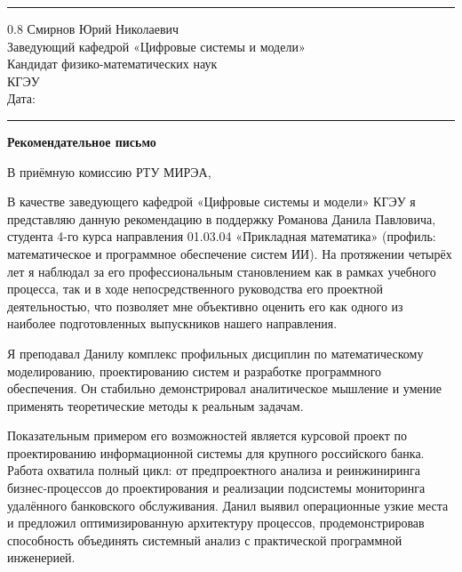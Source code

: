 \documentclass[a4paper,12pt]{article}
\begin{document}
\vspace{4pt}
\noindent\rule{\textwidth}{0.8pt}

\begin{flushright}
  \begin{spacing}{0.8}
    Смирнов Юрий Николаевич\\
    Заведующий кафедрой «Цифровые системы и модели»\\
    Кандидат физико-математических наук\\
    КГЭУ\\[6pt]
    Дата: \rule{4cm}{0.4pt}
  \end{spacing}
\end{flushright}

\begin{center}
  {\Large\bfseries Рекомендательное письмо}
\end{center}

В приёмную комиссию РТУ МИРЭА,

В качестве заведующего кафедрой «Цифровые системы и модели» КГЭУ я представляю данную рекомендацию в поддержку Романова Данила Павловича, студента 4-го курса направления 01.03.04 «Прикладная математика» (профиль: ма\-те\-ма\-ти\-че\-ское и про\-грамм\-ное обес\-пе\-че\-ние систем ИИ). На протяжении четырёх лет я наблюдал за его профессиональным становлением как в рамках учебного процесса, так и в ходе непосредственного руководства его проектной деятельностью, что позволяет мне объективно оценить его как одного из наиболее подготовленных выпускников нашего направления.

Я преподавал Данилу комплекс профильных дисциплин по математическому моделированию, проектированию систем и разработке программного обеспечения. Он стабильно демонстрировал аналитическое мышление и умение применять теоретические методы к реальным задачам.

Показательным примером его возможностей является курсовой проект по проектированию информационной системы для крупного российского банка. Работа охватила полный цикл: от предпроектного анализа и реинжиниринга бизнес-процессов до проектирования и реализации подсистемы мониторинга удалённого банковского обслуживания. Данил выявил операционные узкие места и предложил оптимизированную архитектуру процессов, продемонстрировав способность объединять системный анализ с практической программной инженерией.
\end{document}
